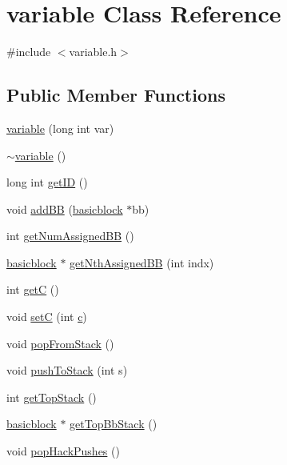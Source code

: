 \hypertarget{classvariable}{
\section{variable Class Reference}
\label{classvariable}
}


{\ttfamily \#include $<$variable.h$>$}

\subsection*{Public Member Functions}
\begin{DoxyCompactItemize}
\item 
\hyperlink{classvariable_a0eaf13bf7764096058482fc8573673bb}{variable} (long int var)
\item 
\hyperlink{classvariable_a0d4f33ab2b101379df069ff881c4c03f}{$\sim$variable} ()
\item 
long int \hyperlink{classvariable_a1134c24e98e73b266b91d02eb253e031}{getID} ()
\item 
void \hyperlink{classvariable_acab6f948f07a2935c12917a4a2a8c46a}{addBB} (\hyperlink{classbasicblock}{basicblock} $\ast$bb)
\item 
int \hyperlink{classvariable_a53fb79e20c7ca14c872830461025c11c}{getNumAssignedBB} ()
\item 
\hyperlink{classbasicblock}{basicblock} $\ast$ \hyperlink{classvariable_a651a5439b34d9eae8ceacca7ecbfc3e8}{getNthAssignedBB} (int indx)
\item 
int \hyperlink{classvariable_a57838c6bf0ac170ee02a0e3a099aec35}{getC} ()
\item 
void \hyperlink{classvariable_ac570372e439e2d75875b8b2253069ce6}{setC} (int \hyperlink{_8AppleDouble_2sat__counter_8cpp_aa41808e37ba1ecae7ee6bde4a5c62f82}{c})
\item 
void \hyperlink{classvariable_a0d0cee61944333e78fecef0365d35cbe}{popFromStack} ()
\item 
void \hyperlink{classvariable_ae0d9d0c11701ccb08719cb5f27fa75e4}{pushToStack} (int s)
\item 
int \hyperlink{classvariable_a3f153f4bceb60929467548bd8885d61e}{getTopStack} ()
\item 
\hyperlink{classbasicblock}{basicblock} $\ast$ \hyperlink{classvariable_a3c88482acd58a7f9f38b5467d6edcff7}{getTopBbStack} ()
\item 
void \hyperlink{classvariable_a8004cca5263b1d3a296e4c5481b6db2a}{popHackPushes} ()
\end{DoxyCompactItemize}


